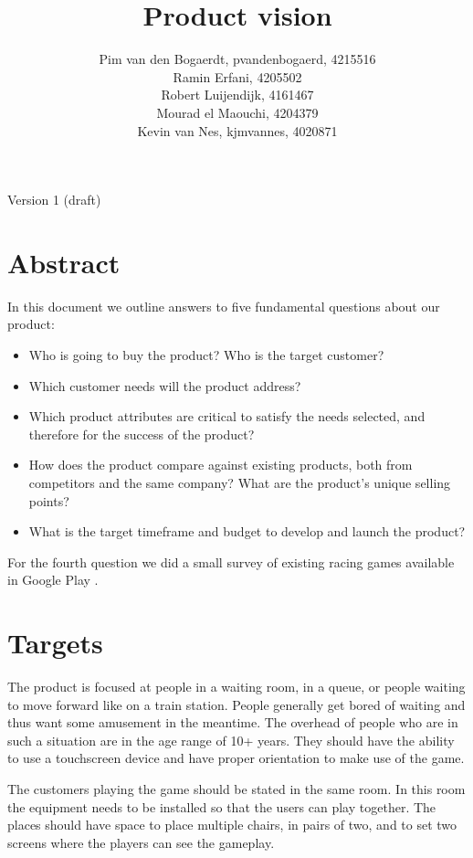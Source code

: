 \documentclass[11pt,twoside,a4paper]{article}
\title{Product vision}
\author{
	Pim van den Bogaerdt, pvandenbogaerd, 4215516\\
	Ramin Erfani, 4205502\\
	Robert Luijendijk, 4161467\\
	Mourad el Maouchi, 4204379\\
	Kevin van Nes, kjmvannes, 4020871
}
\begin{document}
\maketitle
\begin{center}
Version 1 (draft)
\end{center}
\clearpage

\section*{Abstract}
In this document we outline answers to five fundamental questions \cite{pichler} about our product:

\begin{itemize}
\item Who is going to buy the product? Who is the target customer? 
\item Which customer needs will the product address? 
\item Which product attributes are critical to satisfy the needs selected, and therefore for the success of the product? 
\item How does the product compare against existing products, both from competitors and the same company? What are the product’s unique selling points? 
\item What is the target timeframe and budget to develop and launch the product?
\end{itemize}

For the fourth question we did a small survey of existing racing games available in Google Play \cite{googleplay}.

\clearpage
\tableofcontents

\clearpage

\section{Targets}
The product is focused at people in a waiting room, in a queue, or people waiting to move forward like on a train station. People generally get bored of waiting and thus want some amusement in the meantime. The overhead of people who are in such a situation are in the age range of 10+ years. They should have the ability to use a touchscreen device and have proper orientation to make use of the game.

The customers playing the game should be stated in the same room. In this room the equipment needs to be installed so that the users can play together. The places should have space to place multiple chairs, in pairs of two, and to set two screens where the players can see the gameplay.
\end{document}
